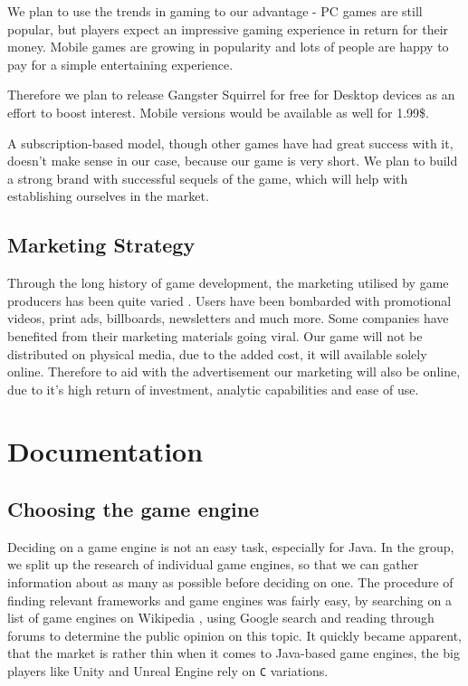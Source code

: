 \documentclass[12p]{article}
\begin{document}
We plan to use the trends in gaming to our advantage - PC games are still popular, but players expect an impressive gaming experience in return for their money. Mobile games are growing in popularity and lots of people are happy to pay for a simple entertaining experience.

Therefore we plan to release Gangster Squirrel for free for Desktop devices as an effort to boost interest. Mobile versions would be available as well for 1.99\$.

A subscription-based model, though other games have had great success with it, doesn’t make sense in our case, because our game is very short. We plan to build a strong brand with successful sequels of the game, which will help with establishing ourselves in the market.

\subsection{Marketing Strategy}
Through the long history of game development, the marketing utilised by game producers has been quite varied \cite{MarketingStrategyExamples}. Users have been bombarded with promotional videos, print ads, billboards, newsletters and much more. Some companies have benefited from their marketing materials going viral.
Our game will not be distributed on physical media, due to the added cost, it will available solely online. Therefore to aid with the advertisement our marketing will also be online, due to it's high return of investment, analytic capabilities and ease of use.


\newpage
\section{Documentation}


\subsection{Choosing the game engine} \label{DocGameEngine}

Deciding on a game engine is not an easy task, especially for Java. In the group, we split up the research of individual game engines, so that we can gather information about as many as possible before deciding on one. The procedure of finding relevant frameworks and game engines was fairly easy, by searching on a list of game engines on Wikipedia \cite{ListOfGameEngines}, using Google search and reading through forums to determine the public opinion on this topic. It quickly became apparent, that the market is rather thin when it comes to Java-based game engines, the big players like Unity \cite{UnityGameEngine} and Unreal Engine \cite{UnrealEngine} rely on \texttt{C} variations.
\end{document}
